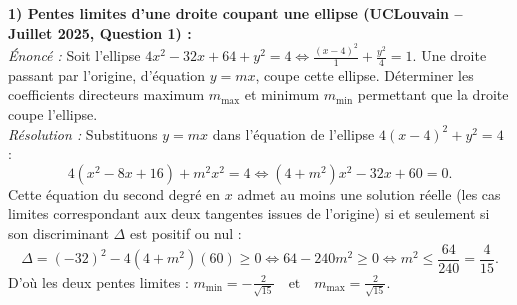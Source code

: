\begin{exemple}
\textbf{1) Pentes limites d'une droite coupant une ellipse (UCLouvain -- Juillet 2025, Question 1) :}\\
\emph{Énoncé :} Soit l'ellipse $4x^2 - 32x + 64 + y^2 = 4 \iff \frac{(x-4)^2}{1} + \frac{y^2}{4} = 1$. Une droite passant par l'origine, d'équation $y = mx$, coupe cette ellipse. Déterminer les coefficients directeurs maximum $m_{\max}$ et minimum $m_{\min}$ permettant que la droite coupe l'ellipse.\\
\emph{Résolution :} Substituons $y = mx$ dans l'équation de l'ellipse $4(x-4)^2 + y^2 = 4$ :
\[
    4(x^2 - 8x + 16) + m^2 x^2 = 4 \iff (4 + m^2)x^2 - 32x + 60 = 0.
\]
Cette équation du second degré en $x$ admet au moins une solution réelle (les cas limites correspondant aux deux tangentes issues de l'origine) si et seulement si son discriminant $\Delta$ est positif ou nul :
\[
    \Delta = (-32)^2 - 4(4 + m^2)(60) \ge 0 \iff 64 - 240m^2 \ge 0 \iff m^2 \le \frac{64}{240} = \frac{4}{15}.
\]
D'où les deux pentes limites : $\boxed{m_{\min} = -\frac{2}{\sqrt{15}} \quad \text{et} \quad m_{\max} = \frac{2}{\sqrt{15}}}$.


\end{exemple}
